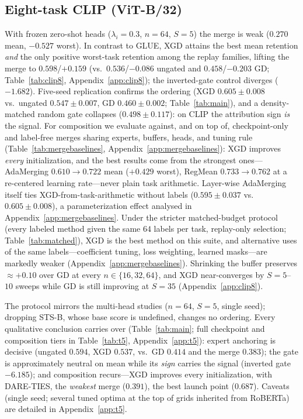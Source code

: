 \documentclass{article} %
\begin{document}
\subsection{Eight-task CLIP (ViT-B/32)}
\label{sec:mergebaselines}
With frozen zero-shot heads ($\lambda_i=0.3$, $n=64$, $S=5$) the merge is weak ($0.270$ mean, $-0.527$ worst). In contrast to GLUE, XGD attains the best mean retention \emph{and} the only positive worst-task retention among the replay families, lifting the merge to $0.598$/$+0.159$ (vs.\ $0.536$/$-0.086$ ungated and $0.458$/$-0.203$ GD; Table~\ref{tab:clip8}, Appendix~\ref{app:clip8}); the inverted-gate control diverges ($-1.682$). Five-seed replication confirms the ordering (XGD $0.605\pm0.008$ vs.\ ungated $0.547\pm0.007$, GD $0.460\pm0.002$; Table~\ref{tab:main}), and a density-matched random gate collapses ($0.498\pm0.117$): on CLIP the attribution sign \emph{is} the signal. For composition we evaluate against, and on top of, checkpoint-only and label-free merges sharing experts, buffers, heads, and tuning rule (Table~\ref{tab:mergebaselines}, Appendix~\ref{app:mergebaselines}): XGD improves \emph{every} initialization, and the best results come from the strongest ones---AdaMerging $0.610\to0.722$ mean ($+0.429$ worst), RegMean $0.733\to0.762$ at a re-centered learning rate---never plain task arithmetic. Layer-wise AdaMerging itself ties XGD-from-task-arithmetic without labels ($0.595\pm0.037$ vs.\ $0.605\pm0.008$), a parameterization effect analysed in Appendix~\ref{app:mergebaselines}. Under the stricter matched-budget protocol (every labeled method given the same $64$ labels per task, replay-only selection; Table~\ref{tab:matched}), XGD is the best method on this suite, and alternative uses of the same labels---coefficient tuning, loss weighting, learned masks---are markedly weaker (Appendix~\ref{app:mergebaselines}). Shrinking the buffer preserves ${\approx}{+}0.10$ over GD at every $n\in\{16,32,64\}$, and XGD near-converges by $S=5$--$10$ sweeps while GD is still improving at $S=35$ (Appendix~\ref{app:clip8}).

The protocol mirrors the multi-head studies ($n=64$, $S=5$, single seed); dropping STS-B, whose base score is undefined, changes no ordering. Every qualitative conclusion carries over (Table~\ref{tab:main}; full checkpoint and composition tiers in Table~\ref{tab:t5}, Appendix~\ref{app:t5}): expert anchoring is decisive (ungated $0.594$, XGD $0.537$, vs.\ GD $0.414$ and the merge $0.383$); the gate is approximately neutral on mean while its \emph{sign} carries the signal (inverted gate $-6.185$); and composition recurs---XGD improves every initialization, with DARE-TIES, the \emph{weakest} merge ($0.391$), the best launch point ($0.687$). Caveats (single seed; several tuned optima at the top of grids inherited from RoBERTa) are detailed in Appendix~\ref{app:t5}.
\end{document}
